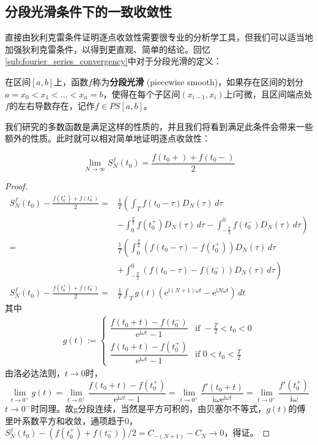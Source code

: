 \subsection{分段光滑条件下的一致收敛性}\label{sub:uniform_converge}
直接由狄利克雷条件证明逐点收敛性需要很专业的分析学工具，但我们可以适当地加强狄利克雷条件，以得到更直观、简单的结论\cite{folland}。回忆\ref{sub:fourier_series_convergency}中对于分段光滑的定义：
\begin{definition}[分段光滑]
在区间$[a,b]$上，函数$f$称为\textbf{分段光滑} (piecewise smooth)，如果存在区间的划分$a=x_0<x_1<\dots <x_n=b$，使得在每个子区间$(x_{i-1},x_i)$上f可微，且区间端点处$f$的左右导数存在，记作$f\in PS[a,b]$。
\end{definition}
我们研究的多数函数是满足这样的性质的，并且我们将看到满足此条件会带来一些额外的性质。此时就可以相对简单地证明逐点收敛性：
\begin{theorem}[傅里叶级数的逐点收敛性]
    \[\lim_{N\to\infty}S_N^f(t_0)=\frac{f(t_0+)+f(t_0-)}{2}\]
\end{theorem}
\begin{proof}
\begin{align*}
    S_N^f(t_0)-\frac{f(t_0^+)+f(t_0^-)}{2} =&\frac{1}{T}\left(\int_{T}f(t_0-\tau)D_N(\tau)\,d\tau\right.\\
    &\left.-\int_{0}^{\frac{T}{2}}f(t_0^+)D_N(\tau)\,d\tau-\int_{-\frac{T}{2}}^{0}f(t_0^-)D_N(\tau)\,d\tau\right)\\
    =&\frac{1}{T}\left(\int_{0}^{\frac{T}{2}}(f(t_0-\tau)-f(t_0^+))D_N(\tau)\,d\tau\right.\\
    &+\left.\int_{-\frac{T}{2}}^{0}(f(t_0-\tau)-f(t_0^-))D_N(\tau)\,d\tau\right)\\
    S_N^f(t_0)-\frac{f(t_0^+)+f(t_0^-)}{2}=&\frac{1}{T}\int_{T}g(t)\left(\mathrm{e}^{\mathrm{i}(N+1)\omega t}-\mathrm{e}^{\mathrm{i}N\omega t}\right)\,dt                            
\end{align*}
其中\begin{align*}
g(t):=\begin{cases}
\dfrac{f(t_0+t)-f(t_0^-)}{\mathrm{e}^{\mathrm{i}\omega t}-1} & \text{if }-\frac{T}{2}<t_0<0 \\
\dfrac{f(t_0+t)-f(t_0^+)}{\mathrm{e}^{\mathrm{i}\omega t}-1} & \text{if }0<t_0<\frac{T}{2}
\end{cases}
\end{align*}                        
由洛必达法则，$t\to 0$时，\[\lim_{t\to 0^+}g(t)=\lim_{t\to 0^+}\frac{f(t_0+t)-f(t_0^+)}{\mathrm{e}^{\mathrm{i}\omega t}-1}=\lim_{t\to 0^+}\frac{f'(t_0+t)}{\mathrm{i}\omega \mathrm{e}^{\mathrm{i}\omega t}}=\lim_{t\to 0^+}\frac{f'(t_0^+)}{\mathrm{i}\omega}\]
$t\to 0^-$时同理。故g分段连续，当然是平方可积的，由贝塞尔不等式，$g(t)$的傅里叶系数平方和收敛，通项趋于0，$S_N^f(t_0)-\left(f(t_0^+)+f(t_0^-)\right)/2=C_{-(N+1)}-C_N\to 0$，得证。
\end{proof}

